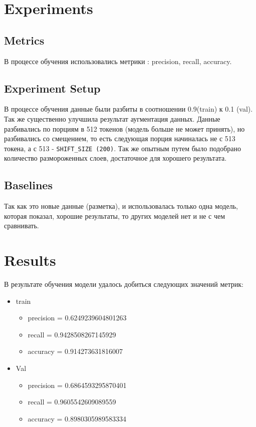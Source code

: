 \documentclass{article}
\begin{document}
\section{Experiments}
\subsection{Metrics}
В процессе обучения использовались метрики : precision, recall, accuracy.

\subsection{Experiment Setup}
В процессе обучения данные были разбиты в соотношении 0.9(train) к 0.1 (val).  Так же существенно улучшила результат аугментация данных. Данные разбивались по порциям в 512 токенов (модель больше не может принять), но разбивались со смещением, то есть следующая порция начиналась не с 513 токена, а с 513 -  \verb|SHIFT_SIZE (200)|. 
Так же опытным путем было подобрано количество размороженных слоев, достаточное для хорошего результата.

\subsection{Baselines}
Так как это новые данные (разметка), и использовалась только одна модель, которая показал, хорошие результаты, то других моделей нет и не с чем сравнивать.

\section{Results}
В результате обучения модели удалось добиться следующих значений метрик:

\begin{itemize}
  \item train
    \begin{itemize}
        \item precision = 0.6249239604801263
        \item recall =  0.9428508267145929
        \item accuracy = 0.914273631816007
    \end{itemize}
    \item Val
    \begin{itemize}
        \item precision = 0.6864593295870401
        \item recall =  0.9605542609089559
        \item accuracy = 0.8980305989583334
    \end{itemize}
\end{itemize}
\end{document}
